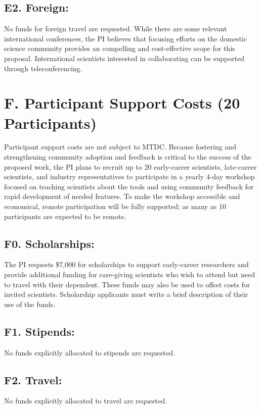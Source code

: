 \documentclass[11pt,oneside]{memoir}
\begin{document}
\subsection{E2. Foreign:}
No funds for foreign travel are requested.  While there are some relevant international conferences, the PI believes that focusing efforts on the domestic science community provides an compelling and cost-effective scope for this proposal.  International scientists interested in collaborating can be supported through teleconferencing.


\section*{F. Participant Support Costs (20 Participants)} 
Participant support costs are not subject to MTDC.  Because fostering and strengthening community adoption and feedback is critical to the success of the proposed work, the PI plans to recruit up to 20 early-career scientists, late-career scientists, and industry representatives to participate in a yearly 4-day workshop focused on teaching scientists about the tools and using community feedback for rapid development of needed features.  To make the workshop accessible and economical, remote participation will be fully supported; as many as 10 participants are expected to be remote.

\subsection{F0. Scholarships:}
The PI requests \$7,000 for scholarships to support early-career researchers and provide additional funding for care-giving scientists who wish to attend but need to travel with their dependent.  These funds may also be used to offset costs for invited scientists.  Scholarship applicants must write a brief description of their use of the funds.

\subsection*{F1. Stipends:}  
No funds explicitly allocated to stipends are requested.

\subsection*{F2. Travel:} 
No funds explicitly allocated to travel are requested.
\end{document}
